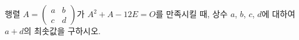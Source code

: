 행렬 $A=\begin{pmatrix} a & b \\ c & d \end{pmatrix}$가 $A^2+A-12E=O$를 만족시킬 때, 상수 $a$, $b$, $c$, $d$에 대하여 $a+d$의 최솟값을 구하시오.
